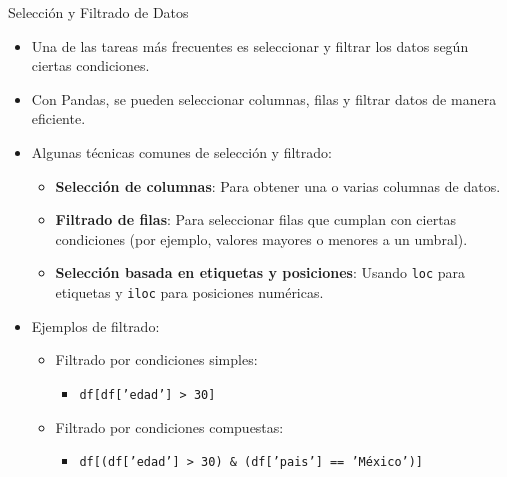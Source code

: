 \documentclass[spanish]{beamer}
\begin{document}
\begin{frame}{Selección y Filtrado de Datos}
    \begin{itemize}
        \item Una de las tareas más frecuentes es seleccionar y filtrar los datos según ciertas condiciones.
        \item Con Pandas, se pueden seleccionar columnas, filas y filtrar datos de manera eficiente.
        \item Algunas técnicas comunes de selección y filtrado:
        \begin{itemize}
            \item \textbf{Selección de columnas}: Para obtener una o varias columnas de datos.
            \item \textbf{Filtrado de filas}: Para seleccionar filas que cumplan con ciertas condiciones (por ejemplo, valores mayores o menores a un umbral).
            \item \textbf{Selección basada en etiquetas y posiciones}: Usando \texttt{loc} para etiquetas y \texttt{iloc} para posiciones numéricas.
        \end{itemize}
        \item Ejemplos de filtrado:
        \begin{itemize}
            \item Filtrado por condiciones simples:
            \begin{itemize}
                \item \texttt{df[df['edad'] > 30]}
            \end{itemize}
            \item Filtrado por condiciones compuestas:
            \begin{itemize}
                \item \texttt{df[(df['edad'] > 30) \& (df['pais'] == 'México')]}
            \end{itemize}
        \end{itemize}
    \end{itemize}
\end{frame}
\end{document}
